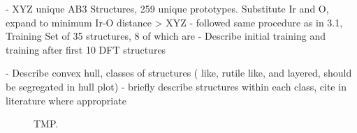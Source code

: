 
- XYZ unique AB3 Structures, 259 unique prototypes.  Substitute Ir and O, expand to minimum Ir-O distance > XYZ
- followed same procedure as in 3.1, Training Set of 35 structures, 8 of which are 
- Describe initial training and training after first 10 DFT structures

- Describe convex hull, classes of structures ( like, rutile like, and layered, should be segregated in hull plot)
- briefly describe structures within each class, cite in literature where appropriate

\begin{figure}
\centering
{}

\caption{\label{fig:convergence_plot_iro3_0}
  TMP.
  }
\end{figure}
